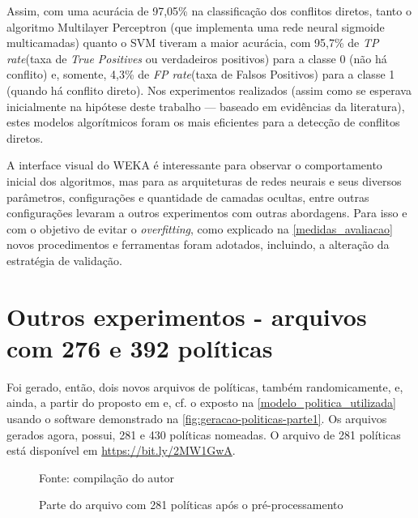 Assim, com uma acurácia de 97,05\% na classificação dos conflitos diretos, tanto o algoritmo Multilayer Perceptron (que implementa uma rede neural sigmoide multicamadas) quanto o SVM tiveram a maior acurácia, com 95,7\% de \textit{TP rate}(taxa de \textit{True Positives} ou verdadeiros positivos) para a classe 0 (não há conflito) e, somente, 4,3\% de \textit{FP rate}(taxa de Falsos Positivos) para a classe 1 (quando há conflito direto). Nos experimentos realizados (assim como se esperava inicialmente na hipótese deste trabalho --- baseado em evidências da literatura), estes modelos algorítmicos foram os mais eficientes para a detecção de conflitos diretos.

A interface visual do WEKA é interessante para observar o comportamento inicial dos algoritmos, mas para as arquiteturas de redes neurais e seus diversos parâmetros, configurações e quantidade de camadas ocultas, entre outras configurações levaram a outros experimentos com outras abordagens. Para isso e com o objetivo de evitar o \textit{overfitting}, como explicado na \autoref{medidas_avaliacao} novos procedimentos e ferramentas foram adotados, incluindo, a alteração da estratégia de validação.

\section{Outros experimentos - arquivos com 276 e 392 políticas}\label{exp:139-281}
Foi gerado, então, dois novos arquivos de políticas, também randomicamente, e, ainda, a partir do proposto em  e, cf. o exposto na \autoref{modelo_politica_utilizada} usando o software demonstrado na \autoref{fig:geracao-politicas-parte1}. Os arquivos gerados agora, possui, 281 e 430 políticas nomeadas. O arquivo de 281 políticas está disponível em \hyperlink{https://bit.ly/2MW1GwA}{https://bit.ly/2MW1GwA}.

\begin{figure}[h!]
	\centering
	\caption{Parte do arquivo com 281 políticas após o pré-processamento}
	
	\label{fig:dataset-281}
	{\scriptsize Fonte: compilação do autor}
\end{figure}

